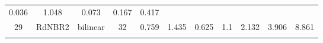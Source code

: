 \documentclass[twoside,12pt,final]{ucthesis-CA2012}
\begin{document}
\begin{ucmainmatter}
\begin{longtable}[]{@{}ccccccccccc@{}}
\begin{minipage}[t]{0.07\columnwidth}
0.036\strut
\end{minipage} & \begin{minipage}[t]{0.07\columnwidth}\centering\strut
1.048\strut
\end{minipage} & \begin{minipage}[t]{0.05\columnwidth}\centering\strut
0.073\strut
\end{minipage} & \begin{minipage}[t]{0.05\columnwidth}\centering\strut
0.167\strut
\end{minipage} & \begin{minipage}[t]{0.05\columnwidth}\centering\strut
0.417\strut
\end{minipage}\tabularnewline
\begin{minipage}[t]{0.04\columnwidth}\centering\strut
29\strut
\end{minipage} & \begin{minipage}[t]{0.11\columnwidth}\centering\strut
RdNBR2\strut
\end{minipage} & \begin{minipage}[t]{0.06\columnwidth}\centering\strut
bilinear\strut
\end{minipage} & \begin{minipage}[t]{0.08\columnwidth}\centering\strut
32\strut
\end{minipage} & \begin{minipage}[t]{0.08\columnwidth}\centering\strut
0.759\strut
\end{minipage} & \begin{minipage}[t]{0.07\columnwidth}\centering\strut
1.435\strut
\end{minipage} & \begin{minipage}[t]{0.07\columnwidth}\centering\strut
0.625\strut
\end{minipage} & \begin{minipage}[t]{0.07\columnwidth}\centering\strut
1.1\strut
\end{minipage} & \begin{minipage}[t]{0.05\columnwidth}\centering\strut
2.132\strut
\end{minipage} & \begin{minipage}[t]{0.05\columnwidth}\centering\strut
3.906\strut
\end{minipage} & \begin{minipage}[t]{0.05\columnwidth}\centering\strut
8.861\strut
\end{minipage}\tabularnewline
\begin{minipage}[t]{0.04\columnwidth}\centering\strut

\end{minipage}
\end{longtable}
\end{ucmainmatter}
\end{document}
